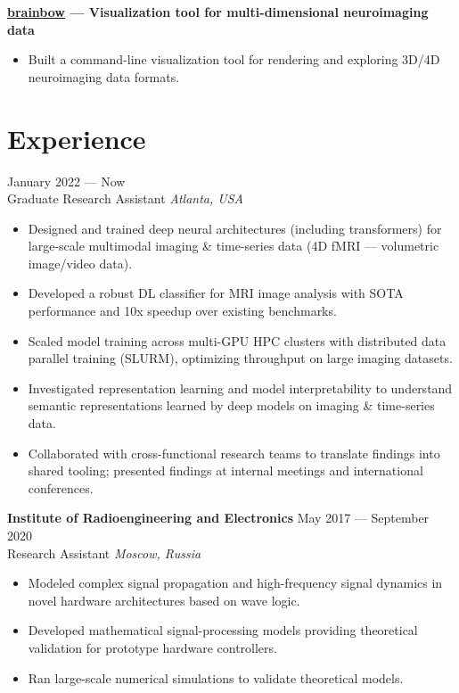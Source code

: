 \documentclass[11pt,a4paper]{article}
\begin{document}
\noindent\textbf{\href{https://pypi.org/project/brainbow/}{brainbow} --- Visualization tool for multi-dimensional neuroimaging data}\\
[-2em]
\begin{itemize}[leftmargin=*,noitemsep]
    \item Built a command-line visualization tool for rendering and exploring 3D/4D neuroimaging data formats.
\end{itemize}
\vspace{-18pt}
\section*{Experience}
 \hfill January 2022 --- Now\\
Graduate Research Assistant \hfill \textit{Atlanta, USA}\\
[-2em]
\begin{itemize}[leftmargin=*,noitemsep]
    \item Designed and trained deep neural architectures (including transformers) for large-scale multimodal imaging \& time-series data (4D fMRI --- volumetric image/video data).
    \item Developed a robust DL classifier for MRI image analysis with SOTA performance and 10x speedup over existing benchmarks.
    \item Scaled model training across multi-GPU HPC clusters with distributed data parallel training (SLURM), optimizing throughput on large imaging datasets.
    \item Investigated representation learning and model interpretability to understand semantic representations learned by deep models on imaging \& time-series data.
    \item Collaborated with cross-functional research teams to translate findings into shared tooling; presented findings at internal meetings and international conferences.
\end{itemize}

\noindent\textbf{Institute of Radioengineering and Electronics} \hfill May 2017 --- September 2020\\
Research Assistant \hfill \textit{Moscow, Russia}\\
[-2em]
\begin{itemize}[leftmargin=*,noitemsep]
    \item Modeled complex signal propagation and high-frequency signal dynamics in novel hardware architectures based on wave logic.
    \item Developed mathematical signal-processing models providing theoretical validation for prototype hardware controllers.
    \item Ran large-scale numerical simulations to validate theoretical models.
\end{itemize}
\vspace{-18pt}
\end{document}

